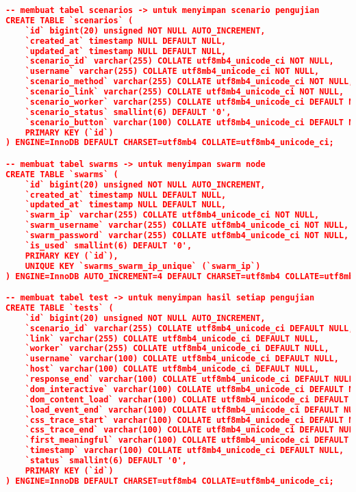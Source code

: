 \begin{lstlisting}[frame=single,tabsize=2,breaklines,caption={Basis data MySQL},label=mysql, captionpos=b, language=json]
-- membuat tabel scenarios -> untuk menyimpan scenario pengujian
CREATE TABLE `scenarios` (
	`id` bigint(20) unsigned NOT NULL AUTO_INCREMENT,
	`created_at` timestamp NULL DEFAULT NULL,
	`updated_at` timestamp NULL DEFAULT NULL,
	`scenario_id` varchar(255) COLLATE utf8mb4_unicode_ci NOT NULL,
	`username` varchar(255) COLLATE utf8mb4_unicode_ci NOT NULL,
	`scenario_method` varchar(255) COLLATE utf8mb4_unicode_ci NOT NULL,
	`scenario_link` varchar(255) COLLATE utf8mb4_unicode_ci NOT NULL,
	`scenario_worker` varchar(255) COLLATE utf8mb4_unicode_ci DEFAULT NULL,
	`scenario_status` smallint(6) DEFAULT '0',
	`scenario_button` varchar(100) COLLATE utf8mb4_unicode_ci DEFAULT NULL,
	PRIMARY KEY (`id`)
) ENGINE=InnoDB DEFAULT CHARSET=utf8mb4 COLLATE=utf8mb4_unicode_ci;

-- membuat tabel swarms -> untuk menyimpan swarm node
CREATE TABLE `swarms` (
	`id` bigint(20) unsigned NOT NULL AUTO_INCREMENT,
	`created_at` timestamp NULL DEFAULT NULL,
	`updated_at` timestamp NULL DEFAULT NULL,
	`swarm_ip` varchar(255) COLLATE utf8mb4_unicode_ci NOT NULL,
	`swarm_username` varchar(255) COLLATE utf8mb4_unicode_ci NOT NULL,
	`swarm_password` varchar(255) COLLATE utf8mb4_unicode_ci NOT NULL,
	`is_used` smallint(6) DEFAULT '0',
	PRIMARY KEY (`id`),
	UNIQUE KEY `swarms_swarm_ip_unique` (`swarm_ip`)
) ENGINE=InnoDB AUTO_INCREMENT=4 DEFAULT CHARSET=utf8mb4 COLLATE=utf8mb4_unicode_ci;

-- membuat tabel test -> untuk menyimpan hasil setiap pengujian
CREATE TABLE `tests` (
	`id` bigint(20) unsigned NOT NULL AUTO_INCREMENT,
	`scenario_id` varchar(255) COLLATE utf8mb4_unicode_ci DEFAULT NULL,
	`link` varchar(255) COLLATE utf8mb4_unicode_ci DEFAULT NULL,
	`worker` varchar(255) COLLATE utf8mb4_unicode_ci DEFAULT NULL,
	`username` varchar(100) COLLATE utf8mb4_unicode_ci DEFAULT NULL,
	`host` varchar(100) COLLATE utf8mb4_unicode_ci DEFAULT NULL,
	`response_end` varchar(100) COLLATE utf8mb4_unicode_ci DEFAULT NULL,
	`dom_interactive` varchar(100) COLLATE utf8mb4_unicode_ci DEFAULT NULL,
	`dom_content_load` varchar(100) COLLATE utf8mb4_unicode_ci DEFAULT NULL,
	`load_event_end` varchar(100) COLLATE utf8mb4_unicode_ci DEFAULT NULL,
	`css_trace_start` varchar(100) COLLATE utf8mb4_unicode_ci DEFAULT NULL,
	`css_trace_end` varchar(100) COLLATE utf8mb4_unicode_ci DEFAULT NULL,
	`first_meaningful` varchar(100) COLLATE utf8mb4_unicode_ci DEFAULT NULL,
	`timestamp` varchar(100) COLLATE utf8mb4_unicode_ci DEFAULT NULL,
	`status` smallint(6) DEFAULT '0',
	PRIMARY KEY (`id`)
) ENGINE=InnoDB DEFAULT CHARSET=utf8mb4 COLLATE=utf8mb4_unicode_ci;


\end{lstlisting}
